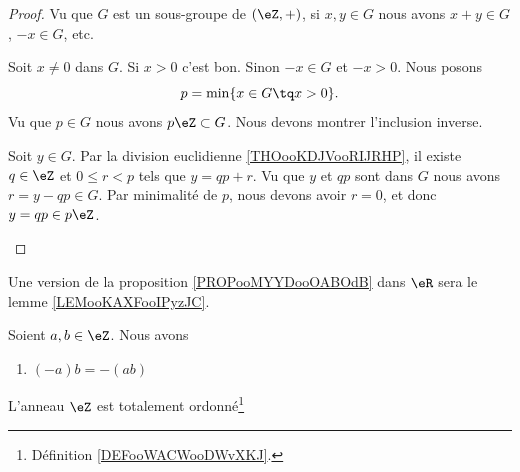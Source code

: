 \begin{proof}
	Vu que \( G\) est un sous-groupe de \( (\eZ,+)\), si \( x,y\in G\) nous avons \( x+y\in G\), \( -x\in G\), etc.
	\begin{subproof}
		Soit \( x\neq 0\) dans \( G\). Si \( x>0\) c'est bon. Sinon \( -x\in G\) et \( -x>0\).
		Nous posons
		\begin{equation}
			p=\min\{ x\in G\tq x>0 \}.
		\end{equation}
		Vu que \( p\in G\) nous avons \( p\eZ\subset G\). Nous devons montrer l'inclusion inverse.

		Soit \( y\in G\). Par la division euclidienne \ref{THOooKDJVooRIJRHP}, il existe \( q\in \eZ\) et \( 0\leq r<p\) tels que \( y=qp+r\). Vu que \( y\) et \( qp\) sont dans \( G\) nous avons \( r=y-qp\in G\). Par minimalité de \( p\), nous devons avoir \( r=0\), et donc \( y=qp\in p\eZ\).
	\end{subproof}
\end{proof}


\begin{normaltext}	\label{NORMooOrdreEntiersRelatifsExtension}
	Une version de la proposition \ref{PROPooMYYDooOABOdB} dans \( \eR\) sera le lemme \ref{LEMooKAXFooIPyzJC}.
\end{normaltext}



\begin{proposition}	\label{PROPooJMETooHQGwnv}
	Soient \( a,b\in \eZ\). Nous avons
	\begin{enumerate}
		\item		\label{ITEMooWNYGooMopPcq}
		      \( (-a)b=-(ab)\)
	\end{enumerate}
\end{proposition}


\begin{proposition}	\label{PROPooADGIooTioqdu}
	L'anneau \( \eZ\) est totalement ordonné\footnote{Définition \ref{DEFooWACWooDWvXKJ}.}
\end{proposition}

